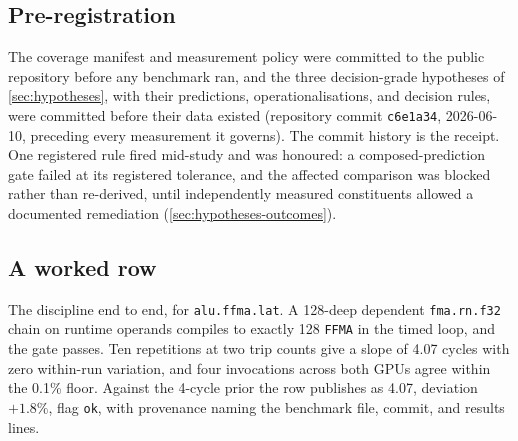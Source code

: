 \subsection{Pre-registration}
\label{sec:prereg}

The coverage manifest and measurement policy were committed to the public
repository before any benchmark ran, and the three decision-grade
hypotheses of \cref{sec:hypotheses}, with their predictions,
operationalisations, and decision rules, were committed before their
data existed (repository commit \texttt{c6e1a34}, 2026-06-10, preceding
every measurement it governs). The commit history is the receipt. One
registered rule fired mid-study and was honoured: a composed-prediction
gate failed at its registered tolerance, and the affected comparison was
blocked rather than re-derived, until independently measured constituents
allowed a documented remediation (\cref{sec:hypotheses-outcomes}).

\subsection{A worked row}

The discipline end to end, for \texttt{alu.ffma.lat}. A 128-deep
dependent \texttt{fma.rn.f32} chain on runtime operands compiles to
exactly 128 \texttt{FFMA} in the timed loop, and the gate passes. Ten
repetitions at two trip counts give a slope of 4.07 cycles with zero
within-run variation, and four invocations across both GPUs agree within
the 0.1\% floor. Against the 4-cycle prior
\citep[tab.~4.1]{jia2019turing} the row publishes as 4.07, deviation
$+1.8\%$, flag \texttt{ok}, with provenance naming the benchmark file,
commit, and results lines.
